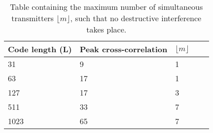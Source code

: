 %
%
%

\begin{table}[t]
	\centering
	\begin{tabular}{ | l | l | l | l | l |  }

		\hline
		Code length (L)	& Peak cross-correlation 	& $\lfloor m \rfloor$	\\ \hline

		31				& 9							& 1	\\ \hline
		63				& 17						& 1	\\ \hline
		127				& 17						& 3	\\ \hline		
		511				& 33						& 7	\\ \hline
		1023			& 65						& 7	\\ \hline
		

	\end{tabular}
	\caption{Table containing the maximum number of simultaneous transmitters $\lfloor m \rfloor$, such that no destructive interference takes place.}
	\label{tbl:correlation-gold-families}
\end{table}



